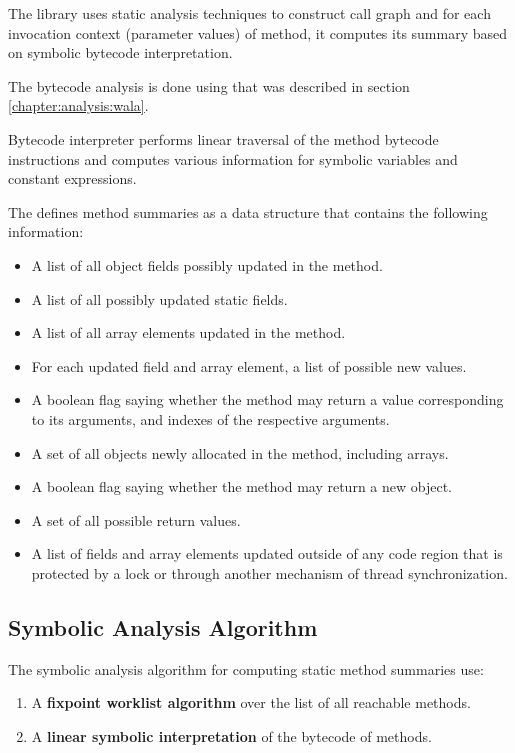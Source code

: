 The library uses static analysis techniques to construct call graph and
for each invocation context (parameter values) of method,
it computes its summary based on symbolic bytecode interpretation.

The bytecode analysis is done using \citet{WalaFramework}
that was described in section \ref{chapter:analysis:wala}.

Bytecode interpreter performs linear traversal of the method bytecode instructions
and computes various information for symbolic variables and constant expressions.

The \citet{ParizekBUBEN} defines method summaries as a data structure
that contains the following information:
\begin{itemize}
  \item A list of all object fields possibly updated in the method.
  \item A list of all possibly updated static fields.
  \item A list of all array elements updated in the method.
  \item For each updated field and array element, a list of possible new values.
  \item A boolean flag saying whether the method may return a value corresponding
    to its arguments, and indexes of the respective arguments.
  \item A set of all objects newly allocated in the method, including arrays.
  \item A boolean flag saying whether the method may return a new object.
  \item A set of all possible return values.
  \item A list of fields and array elements updated outside of any code region that is
    protected by a lock or through another mechanism of thread synchronization.
\end{itemize}



\subsection{Symbolic Analysis Algorithm}

The symbolic analysis algorithm for computing static method summaries use:
\begin{enumerate}
  \item A \textbf{fixpoint worklist algorithm} over the list of all reachable methods.
  \item A \textbf{linear symbolic interpretation} of the bytecode of methods.
\end{enumerate}

